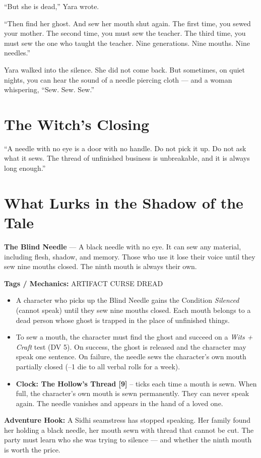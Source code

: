 \documentclass[10pt,twoside]{book}
\newcommand{\tag}[1]{\textsc{#1}}
\begin{document}
``But she is dead,'' Yara wrote.

``Then find her ghost. And sew her mouth shut again. The first time, you sewed your mother. The second time, you must sew the teacher. The third time, you must sew the one who taught the teacher. Nine generations. Nine mouths. Nine needles.''

Yara walked into the silence. She did not come back. But sometimes, on quiet nights, you can hear the sound of a needle piercing cloth --- and a woman whispering, ``Sew. Sew. Sew.''

\section*{The Witch's Closing}
``A needle with no eye is a door with no handle. Do not pick it up. Do not ask what it sews. The thread of unfinished business is unbreakable, and it is always long enough.''

\section*{What Lurks in the Shadow of the Tale}
\begin{infobox}
\textbf{The Blind Needle} --- A black needle with no eye. It can sew any material, including flesh, shadow, and memory. Those who use it lose their voice until they sew nine mouths closed. The ninth mouth is always their own.

\textbf{Tags / Mechanics:} \tag{ARTIFACT} \tag{CURSE} \tag{DREAD}

\begin{itemize}
\item A character who picks up the Blind Needle gains the Condition \textit{Silenced} (cannot speak) until they sew nine mouths closed. Each mouth belongs to a dead person whose ghost is trapped in the place of unfinished things.
\item To sew a mouth, the character must find the ghost and succeed on a \textit{Wits + Craft} test (DV 5). On success, the ghost is released and the character may speak one sentence. On failure, the needle sews the character's own mouth partially closed (--1 die to all verbal rolls for a week).
\item \textbf{Clock: The Hollow's Thread [9]} -- ticks each time a mouth is sewn. When full, the character's own mouth is sewn permanently. They can never speak again. The needle vanishes and appears in the hand of a loved one.
\end{itemize}

\textbf{Adventure Hook:} A Sidhi seamstress has stopped speaking. Her family found her holding a black needle, her mouth sewn with thread that cannot be cut. The party must learn who she was trying to silence --- and whether the ninth mouth is worth the price.
\end{infobox}
\end{document}
